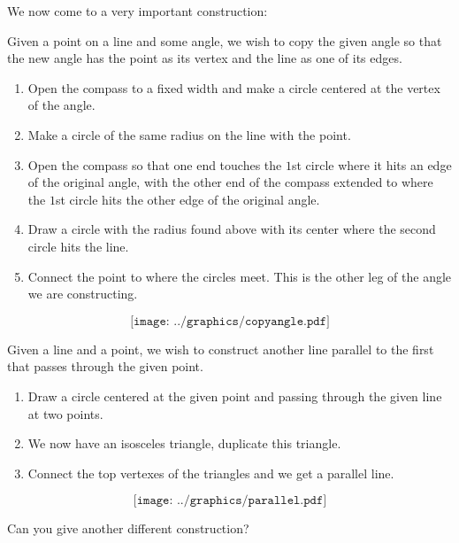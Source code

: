 We now come to a very important construction:

\begin{construction} 
Given a point on a line and some angle, we wish to copy the 
given angle so that the new angle has the point as its 
vertex and the line as one of its edges.
\begin{enumerate}
\item Open the compass to a fixed width and make a circle 
centered at the vertex of the angle.
\item Make a circle of the same radius on the line with the point.
\item Open the compass so that one end touches the $1$st circle 
where it hits an edge of the original angle, with the other end of the compass extended to where the $1$st circle hits the other edge of the original angle.
\item Draw a circle with the radius found above with its center 
where the second circle hits the line.
\item Connect the point to where the circles meet. This is the other leg of the angle we are constructing.
\end{enumerate}
\[
\texttt{[image: ../graphics/copyangle.pdf]}
\]
\end{construction}


\begin{construction} 
 Given a line and a point, we wish to construct another line parallel
 to the first that passes through the given point.
\begin{enumerate}
\item Draw a circle centered at the given point and passing through the given line at two points.
\item We now have an isosceles triangle, duplicate this triangle.
\item Connect the top vertexes of the triangles and we get a parallel line.
\end{enumerate}
\[
\texttt{[image: ../graphics/parallel.pdf]}
\]
\end{construction}


\begin{question} Can you give another different construction?
\end{question}
\QM



